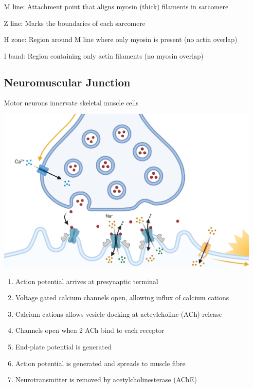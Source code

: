 \documentclass[11pt,fleqn]{book}
\begin{document}
\begin{descriptions}
    \item[M line: ]Attachment point that aligns myosin (thick)
filaments in sarcomere 
    \item[Z line: ]Marks the boundaries of each sarcomere 
    \item[H zone: ]Region around M line where only myosin is
present (no actin overlap)
    \item[I band: ]Region containing only actin filaments (no
myosin overlap)
\end{descriptions}

\subsection{Neuromuscular Junction}
\begin{remark}
    Motor neurons innervate skeletal muscle cells
\end{remark}
\begin{center}
    \includegraphics[width=0.65\linewidth]{Pictures/Screenshot 2024-04-03 005847.png}
\end{center}
\begin{enumerate}
    \item Action potential arrives at presynaptic terminal
    \item Voltage gated calcium channels open, allowing influx of calcium cations
    \item Calcium cations allows vesicle docking at acteylcholine (ACh) release
    \item Channels open when 2 ACh bind to each receptor
    \item End-plate potential is generated
    \item Action potential is generated and spreads to muscle fibre
    \item Neurotransmitter is removed by acetylcholinesterase (AChE)
\end{enumerate}
\end{document}
